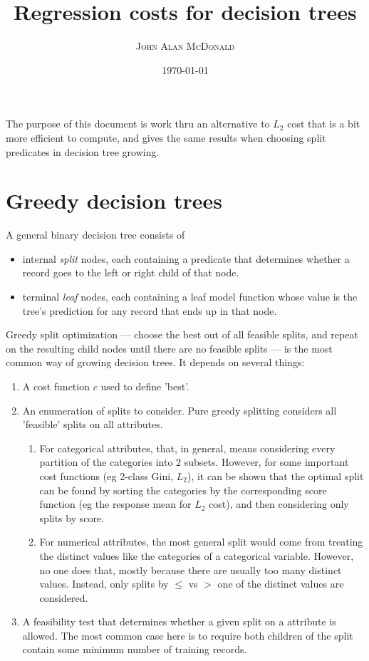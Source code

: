 \documentclass[10pt,openany]{article}
\title{Regression costs for decision trees}
\author{\textsc{John Alan McDonald }}
\date{\today}
\numberwithin{definition}{section}
\numberwithin{example}{section}
\numberwithin{equation}{section}
\numberwithin{figure}{section}
\begin{document}
\maketitle

The purpose of this document is work thru an alternative to $L_2$
cost that is a bit more efficient to compute, and gives the same
results when choosing split predicates in decision tree growing.

\section{\label{sub:Decision-trees}Greedy decision trees}

A general binary decision tree consists of
\begin{itemize}
\item internal \emph{split} nodes, each containing a predicate 
that determines
whether a record goes to the left or right child of that node.
\item terminal \emph{leaf} nodes, each containing a leaf model
 function whose value is the tree's prediction for any record 
 that ends up in that node. 
\end{itemize}

Greedy split optimization --- choose the best out of all
feasible splits, and repeat on the resulting child nodes until
there are no feasible splits --- is the most common way of
growing decision trees.
It depends on several things:
\begin{enumerate}
  \item A cost function $c$ used to define 'best'.  
  \item An enumeration of splits to consider. Pure greedy 
  splitting
  considers all 'feasible' splits on all attributes.
  \begin{enumerate} 
    \item For categorical attributes, that, in general, means 
    considering every partition of the categories into $2$ 
    subsets. However, for some important cost functions 
    (eg 2-class Gini, $L_2$), it can be shown that the optimal 
    split can be found by sorting the categories by the 
    corresponding score function (eg the response mean for $L_2$ 
    cost), and then considering only splits by score.
    \item For numerical attributes, the most general split would 
    come from treating the distinct values like the categories 
    of a categorical variable. However, no one does that, mostly 
    because there are usually too many distinct values. Instead, 
    only splits by
    $\leq$ vs $>$ one of the distinct values are considered.
\end{enumerate}
\item A feasibility test that determines whether a given split 
on a attribute is allowed. The most common case here is to 
require both children of the split contain some minimum number of 
training records.
\end{enumerate}
\end{document}
